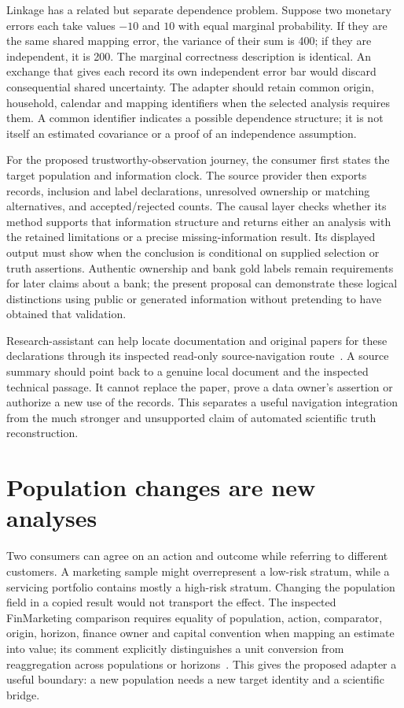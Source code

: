 Linkage has a related but separate dependence problem. Suppose two monetary
errors each take values $-10$ and $10$ with equal marginal probability. If
they are the same shared mapping error, the variance of their sum is 400;
if they are independent, it is 200. The marginal correctness description is
identical. An exchange that gives each record its own independent error bar
would discard consequential shared uncertainty. The adapter should retain
common origin, household, calendar and mapping identifiers when the selected
analysis requires them. A common identifier indicates a possible dependence
structure; it is not itself an estimated covariance or a proof of an
independence assumption.

For the proposed trustworthy-observation journey, the consumer first states
the target population and information clock. The source provider then exports
records, inclusion and label declarations, unresolved ownership or matching
alternatives, and accepted/rejected counts. The causal layer checks whether
its method supports that information structure and returns either an
analysis with the retained limitations or a precise missing-information
result. Its displayed output must show when the conclusion is conditional
on supplied selection or truth assertions. Authentic ownership and bank gold
labels remain requirements for later claims about a bank; the present
proposal can demonstrate these logical distinctions using public or generated
information without pretending to have obtained that validation.

Research-assistant can help locate documentation and original papers for
these declarations through its inspected read-only source-navigation route~\citep{v12_in_inventory}. A source summary should point back to a genuine local
document and the inspected technical passage. It cannot replace the paper,
prove a data owner's assertion or authorize a new use of the records. This
separates a useful navigation integration from the much stronger and
unsupported claim of automated scientific truth reconstruction.


\section{Population changes are new analyses}

Two consumers can agree on an action and outcome while referring to different
customers. A marketing sample might overrepresent a low-risk stratum, while a
servicing portfolio contains mostly a high-risk stratum. Changing the
population field in a copied result would not transport the effect. The
inspected FinMarketing comparison requires equality of population, action,
comparator, origin, horizon, finance owner and capital convention when mapping
an estimate into value; its comment explicitly distinguishes a unit conversion
from reaggregation across populations or horizons~\citep{exec13_i3_inspection}.
This gives the proposed adapter a useful boundary: a new population needs
a new target identity and a scientific bridge.

